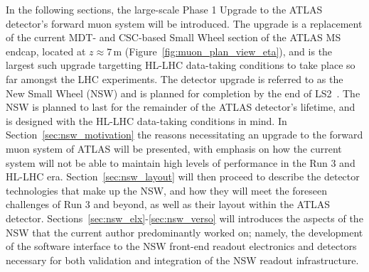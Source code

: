 In the following sections, the large-scale Phase 1 Upgrade to the ATLAS detector's forward muon system
will be introduced.
The upgrade is a replacement of the current MDT- and CSC-based Small Wheel section of the ATLAS MS endcap, located at $z \approx 7$\,m (Figure~\ref{fig:muon_plan_view_eta}),
and is the largest such upgrade targetting HL-LHC data-taking conditions to take place so far amongst the LHC experiments.
The detector upgrade is referred to as the New Small Wheel (NSW) and is planned for completion by
the end of LS2~\cite{NSWTDR}.
The NSW is planned to last for the remainder of the ATLAS detector's lifetime, and is designed with the
HL-LHC data-taking conditions in mind.
In Section~\ref{sec:nsw_motivation} the reasons necessitating an upgrade to the forward muon system
of ATLAS will be presented, with emphasis on how the current system will not be able to maintain high
levels of performance in the Run 3 and HL-LHC era.
Section~\ref{sec:nsw_layout} will then proceed to describe the detector technologies that make up
the NSW, and how they will meet the foreseen challenges of Run 3 and beyond, as well as their layout
within the ATLAS detector.
Sections~\ref{sec:nsw_elx}-\ref{sec:nsw_verso} will introduces the aspects of the NSW that the
current author predominantly worked on; namely, the development of the software interface to the NSW front-end readout
electronics and detectors necessary for both validation and integration of the NSW readout infrastructure.




\FloatBarrier


\FloatBarrier




\FloatBarrier

